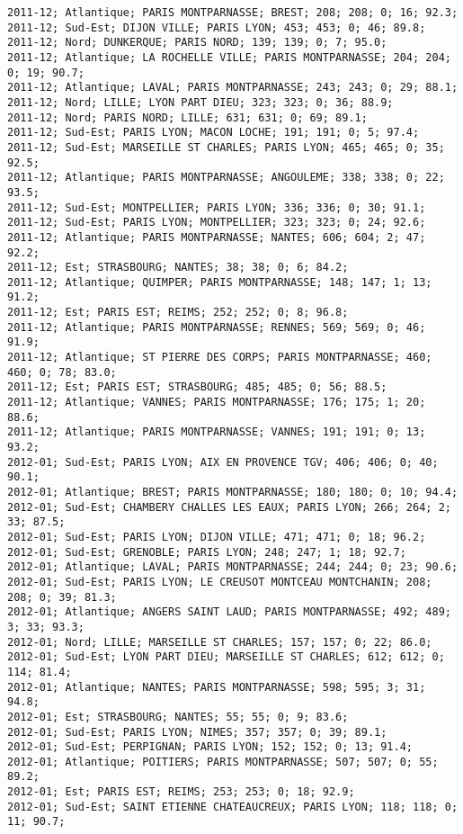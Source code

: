 \documentclass{article}
\begin{document}
\begin{Verbatim}[commandchars=\\\{\}]
2011-12; Atlantique; PARIS MONTPARNASSE; BREST; 208; 208; 0; 16; 92.3; 
2011-12; Sud-Est; DIJON VILLE; PARIS LYON; 453; 453; 0; 46; 89.8; 
2011-12; Nord; DUNKERQUE; PARIS NORD; 139; 139; 0; 7; 95.0; 
2011-12; Atlantique; LA ROCHELLE VILLE; PARIS MONTPARNASSE; 204; 204; 0; 19; 90.7; 
2011-12; Atlantique; LAVAL; PARIS MONTPARNASSE; 243; 243; 0; 29; 88.1; 
2011-12; Nord; LILLE; LYON PART DIEU; 323; 323; 0; 36; 88.9; 
2011-12; Nord; PARIS NORD; LILLE; 631; 631; 0; 69; 89.1; 
2011-12; Sud-Est; PARIS LYON; MACON LOCHE; 191; 191; 0; 5; 97.4; 
2011-12; Sud-Est; MARSEILLE ST CHARLES; PARIS LYON; 465; 465; 0; 35; 92.5; 
2011-12; Atlantique; PARIS MONTPARNASSE; ANGOULEME; 338; 338; 0; 22; 93.5; 
2011-12; Sud-Est; MONTPELLIER; PARIS LYON; 336; 336; 0; 30; 91.1; 
2011-12; Sud-Est; PARIS LYON; MONTPELLIER; 323; 323; 0; 24; 92.6; 
2011-12; Atlantique; PARIS MONTPARNASSE; NANTES; 606; 604; 2; 47; 92.2; 
2011-12; Est; STRASBOURG; NANTES; 38; 38; 0; 6; 84.2; 
2011-12; Atlantique; QUIMPER; PARIS MONTPARNASSE; 148; 147; 1; 13; 91.2; 
2011-12; Est; PARIS EST; REIMS; 252; 252; 0; 8; 96.8; 
2011-12; Atlantique; PARIS MONTPARNASSE; RENNES; 569; 569; 0; 46; 91.9; 
2011-12; Atlantique; ST PIERRE DES CORPS; PARIS MONTPARNASSE; 460; 460; 0; 78; 83.0; 
2011-12; Est; PARIS EST; STRASBOURG; 485; 485; 0; 56; 88.5; 
2011-12; Atlantique; VANNES; PARIS MONTPARNASSE; 176; 175; 1; 20; 88.6; 
2011-12; Atlantique; PARIS MONTPARNASSE; VANNES; 191; 191; 0; 13; 93.2; 
2012-01; Sud-Est; PARIS LYON; AIX EN PROVENCE TGV; 406; 406; 0; 40; 90.1; 
2012-01; Atlantique; BREST; PARIS MONTPARNASSE; 180; 180; 0; 10; 94.4; 
2012-01; Sud-Est; CHAMBERY CHALLES LES EAUX; PARIS LYON; 266; 264; 2; 33; 87.5; 
2012-01; Sud-Est; PARIS LYON; DIJON VILLE; 471; 471; 0; 18; 96.2; 
2012-01; Sud-Est; GRENOBLE; PARIS LYON; 248; 247; 1; 18; 92.7; 
2012-01; Atlantique; LAVAL; PARIS MONTPARNASSE; 244; 244; 0; 23; 90.6; 
2012-01; Sud-Est; PARIS LYON; LE CREUSOT MONTCEAU MONTCHANIN; 208; 208; 0; 39; 81.3; 
2012-01; Atlantique; ANGERS SAINT LAUD; PARIS MONTPARNASSE; 492; 489; 3; 33; 93.3; 
2012-01; Nord; LILLE; MARSEILLE ST CHARLES; 157; 157; 0; 22; 86.0; 
2012-01; Sud-Est; LYON PART DIEU; MARSEILLE ST CHARLES; 612; 612; 0; 114; 81.4; 
2012-01; Atlantique; NANTES; PARIS MONTPARNASSE; 598; 595; 3; 31; 94.8; 
2012-01; Est; STRASBOURG; NANTES; 55; 55; 0; 9; 83.6; 
2012-01; Sud-Est; PARIS LYON; NIMES; 357; 357; 0; 39; 89.1; 
2012-01; Sud-Est; PERPIGNAN; PARIS LYON; 152; 152; 0; 13; 91.4; 
2012-01; Atlantique; POITIERS; PARIS MONTPARNASSE; 507; 507; 0; 55; 89.2; 
2012-01; Est; PARIS EST; REIMS; 253; 253; 0; 18; 92.9; 
2012-01; Sud-Est; SAINT ETIENNE CHATEAUCREUX; PARIS LYON; 118; 118; 0; 11; 90.7; 

\end{Verbatim}
\end{document}
